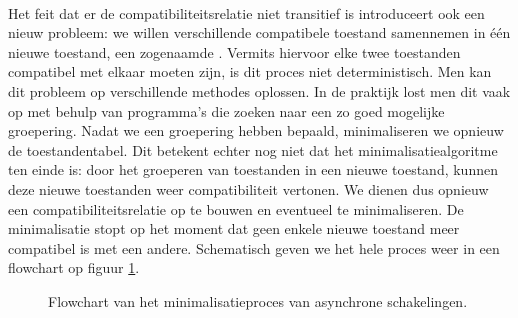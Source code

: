 \paragraph{}
Het feit dat er de compatibiliteitsrelatie niet transitief is introduceert ook een nieuw probleem: we willen verschillende compatibele toestand samennemen in \'e\'en nieuwe toestand, een zogenaamde . Vermits hiervoor elke twee toestanden compatibel met elkaar moeten zijn, is dit proces niet deterministisch. Men kan dit probleem op verschillende methodes oplossen. In de praktijk lost men dit vaak op met behulp van programma's die zoeken naar een zo goed mogelijke groepering. Nadat we een groepering hebben bepaald, minimaliseren we opnieuw de toestandentabel. Dit betekent echter nog niet dat het minimalisatiealgoritme ten einde is: door het groeperen van toestanden in een nieuwe toestand, kunnen deze nieuwe toestanden weer compatibiliteit vertonen. We dienen dus opnieuw een compatibiliteitsrelatie op te bouwen en eventueel te minimaliseren. De minimalisatie stopt op het moment dat geen enkele nieuwe toestand meer compatibel is met een andere. Schematisch geven we het hele proces weer in een flowchart op figuur \ref{fig:flowchartMinimizeAsynchrone}.
\begin{figure}[hbt]
\centering
{}
\caption{Flowchart van het minimalisatieproces van asynchrone schakelingen.}
\label{fig:flowchartMinimizeAsynchrone}
\end{figure}
